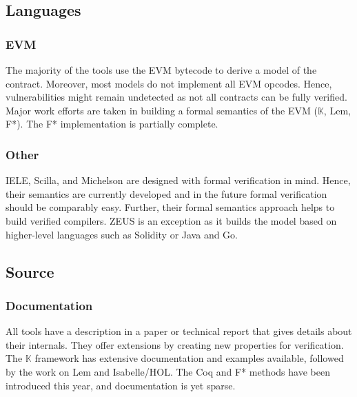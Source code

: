 \subsection{Languages} 
\subsubsection{EVM}
The majority of the tools use the EVM bytecode to derive a model of the contract. Moreover, most models do not implement all EVM opcodes. Hence, vulnerabilities might remain undetected as not all contracts can be fully verified.
Major work efforts are taken in building a formal semantics of the EVM ($\mathbb{K}$, Lem, F*). 
The F* implementation is partially complete. 

\subsubsection{Other}
IELE, Scilla, and Michelson are designed with formal verification in mind. 
Hence, their semantics are currently developed and in the future formal verification should be comparably easy. 
Further, their formal semantics approach helps to build verified compilers.
ZEUS is an exception as it builds the model based on higher-level languages such as Solidity or Java and Go. 


\subsection{Source} 
\subsubsection{Documentation}
All tools have a description in a paper or technical report that gives details about their internals. They offer extensions by creating new properties for verification.
The $\mathbb{K}$ framework has extensive documentation and examples available, followed by the work on Lem and Isabelle/HOL. The Coq and F* methods have been introduced this year, and documentation is yet sparse.

